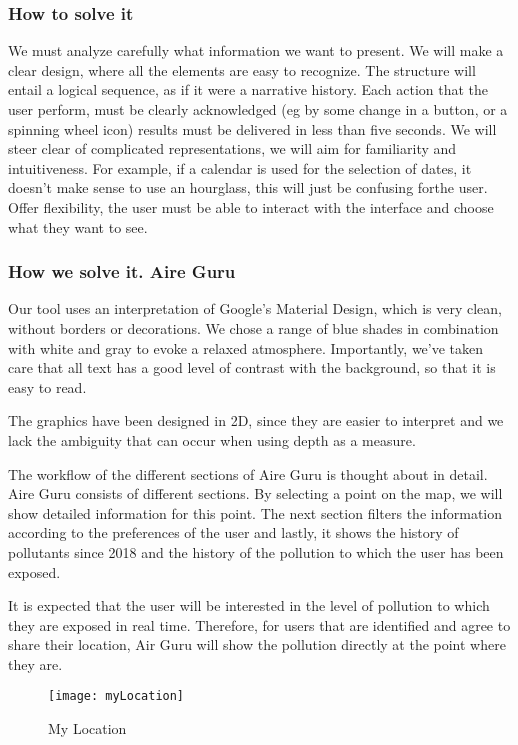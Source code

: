 \subsubsection{How to solve it} 
We must analyze carefully what information we want to present. We will make a clear design, where all the elements are easy to recognize.
The structure will entail a logical sequence, as if it were a narrative history.
Each action that the user perform, must be clearly acknowledged (eg by some change in a button, or a spinning wheel icon) results must be delivered in less than five seconds.
We will steer clear of complicated representations, we will aim for familiarity and intuitiveness.
For example, if a calendar is used for the selection of dates, it doesn't make sense to use an hourglass, this will just be confusing forthe user.
Offer flexibility, the user must be able to interact with the interface and choose what they want to see.

\subsubsection{How we solve it. Aire Guru} 
Our tool uses an interpretation of Google's Material Design, which is very clean, without borders or decorations.
We chose a range of blue shades in combination with white and gray to evoke a relaxed atmosphere.
Importantly, we've taken care that all text has a good level of contrast with the background, so that it is easy to read.

The graphics have been designed in 2D, since they are easier to interpret and we lack the ambiguity that can occur when using depth as a measure.


The workflow of the different sections of Aire Guru is thought about in detail.
Aire Guru consists of different sections. By selecting a point on the map, we
will show detailed information for this point. The next section filters the information according to the preferences of the user
and lastly, it shows the history of pollutants since 2018 and the history of the pollution to which the user has been
exposed.

It is expected that the user will be interested in the level of pollution to which they are exposed in real time. Therefore, for users
that are identified and agree to share their location, Air Guru will show the pollution directly at the point where they are.


\begin{figure}[ht]
    \centering
    \texttt{[image: myLocation]}
    \caption{My Location}
\end{figure}

